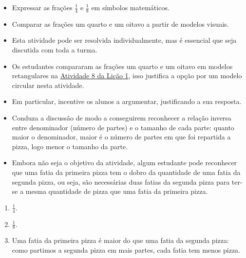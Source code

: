 \begin{atividade}\label{chap2-ativ7}
\objetivos
  \begin{itemize} %
  \item Expressar as frações $\frac{1}{4}$ e $\frac{1}{8}$ em símbolos matemáticos.
  \item Comparar as frações um quarto e um oitavo a partir de modelos visuais.
  \end{itemize} %

\discussoes
\begin{itemize} %
    \item Esta atividade pode ser resolvida individualmente, mas é essencial que seja discutida com toda a turma.
    \item Os estudantes compararam as frações um quarto e um oitavo em modelos retangulares na \hyperref[chap1-ativ8]{Atividade 8 da Lição 1}, isso justifica a opção por um modelo circular nesta atividade.
    \item Em particular, incentive os alunos a argumentar, justificando a sua resposta.
    \item Conduza a discussão de modo a conseguirem reconhecer a relação inversa entre denominador (número de partes) e o tamanho de cada parte: quanto maior o denominador, maior é o número de partes em que foi repartida a pizza, logo menor o tamanho da parte.
      \item Embora não seja o objetivo da atividade, algum estudante pode reconhecer que uma fatia da primeira pizza tem o dobro da quantidade de uma fatia da segunda  pizza, ou seja, são necessárias duas fatias da segunda pizza para ter-se a mesma quantidade de pizza que uma fatia da primeira pizza.
\end{itemize}

\solucao
\begin{enumerate} %
    \item $\frac{1}{4}$.
    \item $\frac{1}{8}$.
    \item Uma fatia da primeira pizza é maior do que uma fatia da segunda pizza: como partimos a segunda pizza em mais partes, cada fatia tem menos pizza.

\end{enumerate} %
\begin{center}
        \quad \quad
\end{center}

\end{atividade}

